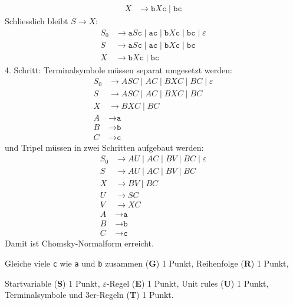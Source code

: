 \begin{loesung}
\begin{teilaufgaben}
\begin{align*}
\\
X & \to \texttt{b}X\texttt{c} \mid  \texttt{bc}
\end{align*}
Schliesslich bleibt $S\to X$:
\begin{align*}
S_0 & \to
\texttt{a} S \texttt{c} \mid  \texttt{ac} \mid 
\texttt{b}X\texttt{c} \mid  \texttt{bc}
\mid  \varepsilon
\\
S & \to
\texttt{a} S \texttt{c} \mid  \texttt{ac} \mid 
\texttt{b}X\texttt{c} \mid  \texttt{bc}
\\
X & \to \texttt{b}X\texttt{c} \mid  \texttt{bc}
\end{align*}
4. Schritt: Terminalsymbole müssen separat umgesetzt werden:
\begin{align*}
S_0 & \to
ASC \mid  AC \mid 
BXC \mid  BC
\mid  \varepsilon
\\
S & \to
A S C \mid  AC \mid 
BXC \mid  BC
\\
X & \to BXC \mid  BC
\\
A&\to \texttt{a} \\
B&\to \texttt{b} \\
C&\to \texttt{c}
\end{align*}
und Tripel müssen in zwei Schritten aufgebaut werden:
\begin{align*}
S_0 & \to AU \mid  AC \mid  BV \mid  BC \mid  \varepsilon
\\
S & \to AU \mid  AC \mid  BV \mid  BC
\\
X & \to BV \mid  BC
\\
U&\to SC
\\
V & \to XC
\\
A&\to \texttt{a} \\
B&\to \texttt{b} \\
C&\to \texttt{c}
\end{align*}
Damit ist Chomsky-Normalform erreicht.
\qedhere
\end{teilaufgaben}
\end{loesung}

\begin{bewertung}
\begin{teilaufgaben}
\item Gleiche viele \texttt{c} wie \texttt{a} und \texttt{b} zusammen
({\bf G}) 1 Punkt,
Reihenfolge ({\bf R}) 1 Punkt,
\item Startvariable ({\bf S}) 1 Punkt,
$\varepsilon$-Regel ({\bf E}) 1 Punkt,
Unit rules ({\bf U}) 1 Punkt,
Terminalsymbole und 3er-Regeln ({\bf T}) 1 Punkt.
\end{teilaufgaben}
\end{bewertung}
